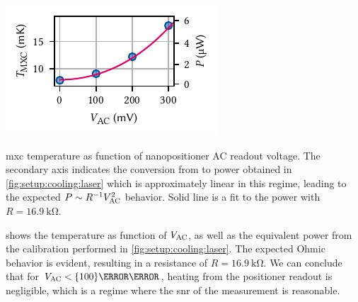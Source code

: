\begin{marginfigure}[*-1]
    \centering
    \includegraphics{img/pdf/setup/anc_readout_heating}
    \caption[]{
        \Acrlong{mxc} temperature as function of nanopositioner AC readout voltage.
        The secondary axis indicates the conversion from \Tmxc to power obtained in \cref{fig:setup:cooling:laser} which is approximately linear in this regime, leading to the expected $P\sim R^{-1} V_{\mathrm{AC}}^2$ behavior.
        Solid line is a fit to the power with $R=\qty{16.9}{\kilo\ohm}$.
    }
    \label{fig:setup:cooling:anc}
\end{marginfigure}

 shows the temperature as function of $V_{\mathrm{AC}}$, as well as the equivalent power from the calibration performed in \cref{fig:setup:cooling:laser}.
The expected Ohmic behavior is evident, resulting in a resistance of $R=\qty{16.9}{\kilo\ohm}$.
We can conclude that for $V_{\mr{AC}} < \qty{100}{\milli\volt}$, heating from the positioner readout is negligible, which is a regime where the \gls{snr} of the measurement is reasonable.


